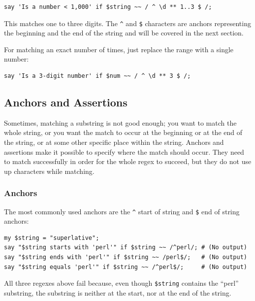 \begin{verbatim}
say 'Is a number < 1,000' if $string ~~ / ^ \d ** 1..3 $ /;
\end{verbatim}
%

This matches one to three digits. The \verb'^' and \verb'$' 
characters are anchors representing the beginning and the 
end of the string and will be covered in the next section.

For matching an exact number of times, just replace the 
range with a single number:

\begin{verbatim}
say 'Is a 3-digit number' if $num ~~ / ^ \d ** 3 $ /;
\end{verbatim}
%

\subsection{Anchors and Assertions}


Sometimes, matching a substring is not good enough; you  
want to match the whole string, or you want the match to occur 
at the beginning or at the end of the string, or at some 
other specific place within the string. Anchors and assertions 
make it possible to specify where the match should occur. 
They need to match successfully in order for the whole 
regex to succeed, but they do not use up characters 
while matching.

\subsubsection{Anchors}


The most commonly used anchors are the \verb'^' start of 
string and \verb'$' end of string anchors:

\begin{verbatim}
my $string = "superlative";
say "$string starts with 'perl'" if $string ~~ /^perl/; # (No output)
say "$string ends with 'perl'" if $string ~~ /perl$/;   # (No output)
say "$string equals 'perl'" if $string ~~ /^perl$/;     # (No output)
\end{verbatim}

All three regexes above fail because, even though 
\verb'$string' contains the ``perl'' substring, the 
substring is neither at the start, nor at the end of 
the string.

